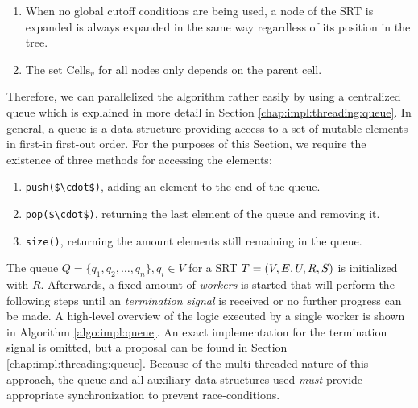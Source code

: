 		\begin{enumerate}
			\item When no global cutoff conditions are being used, a node of the \ac{SRT} is expanded is always expanded in the same way regardless of its position in the tree.
			\item The set $\mathrm{Cells}_v$ for all nodes only depends on the parent cell. 
		\end{enumerate}

		Therefore, we can parallelized the algorithm rather easily by using a centralized queue which is explained in more detail in Section \ref{chap:impl:threading:queue}.
		In general, a queue is a data-structure providing access to a set of mutable elements in first-in first-out order.
		For the purposes of this Section, we require the existence of three methods for accessing the elements:

		\begin{enumerate}
			\item \lstinline[mathescape]|push($\cdot$)|, adding an element to the end of the queue.
			\item \lstinline[mathescape]|pop($\cdot$)|, returning the last element of the queue and removing it.
			\item \lstinline|size()|, returning the amount elements still remaining in the queue.
		\end{enumerate}

		The queue $Q = \{ q_1, q_2, \ldots, q_n \}, q_i \in V$ for a \ac{SRT} $T = (V, E, U, R, S)$ is initialized with $R$. Afterwards, a fixed amount of \textit{workers} is started that will perform the following steps until an \textit{termination signal} is received or no further progress can be made.
		A high-level overview of the logic executed by a single worker is shown in Algorithm \ref{algo:impl:queue}.
		An exact implementation for the termination signal is omitted, but a proposal can be found in Section \ref{chap:impl:threading:queue}.
		Because of the multi-threaded nature of this approach, the queue and all auxiliary data-structures used \textit{must} provide appropriate synchronization to prevent race-conditions.

